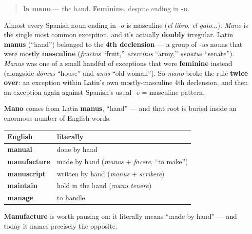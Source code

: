 \begin{grammarlens}[title={Grammar Lens: la mano and its gender}]
\begin{quote}
\textbf{la mano} — the hand. \textbf{Feminine}, despite ending in \textbf{-o}.
\end{quote}

Almost every Spanish noun ending in \emph{-o} is masculine (\emph{el libro, el gato}...). \emph{Mano} is the single most common exception, and it's actually \textbf{doubly} irregular. Latin \textbf{manus} (\textquotedblleft{}hand\textquotedblright{}) belonged to the \textbf{4th declension} — a group of \emph{-us} nouns that were mostly \textbf{masculine} (\emph{frūctus} \textquotedblleft{}fruit,\textquotedblright{} \emph{exercitus} \textquotedblleft{}army,\textquotedblright{} \emph{senātus} \textquotedblleft{}senate\textquotedblright{}). \emph{Manus} was one of a small handful of exceptions that were \textbf{feminine} instead (alongside \emph{domus} \textquotedblleft{}house\textquotedblright{} and \emph{anus} \textquotedblleft{}old woman\textquotedblright{}). So \emph{mano} broke the rule \textbf{twice over}: an exception within Latin's own mostly-masculine 4th declension, and then an exception again against Spanish's usual \emph{-o} = masculine pattern.
\end{grammarlens}

\begin{cousinweb}
\textbf{Mano} comes from Latin \textbf{manus}, \textquotedblleft{}hand\textquotedblright{} — and that root is buried inside an enormous number of English words:

\noindent
\begin{tabularx}{\linewidth}{@{}>{\raggedright\arraybackslash}X>{\raggedright\arraybackslash}X@{}}
\toprule
\textbf{English} & \textbf{literally} \\
\midrule
\textbf{manual} & done by hand \\
\textbf{manufacture} & made by hand (\emph{manus} + \emph{facere}, \textquotedblleft{}to make\textquotedblright{}) \\
\textbf{manuscript} & written by hand (\emph{manus} + \emph{scrībere}) \\
\textbf{maintain} & hold in the hand (\emph{manū tenēre}) \\
\textbf{manage} & to handle \\
\bottomrule
\end{tabularx}

\textbf{Manufacture} is worth pausing on: it literally means \textquotedblleft{}made by hand\textquotedblright{} — and today it names precisely the opposite.
\end{cousinweb}

